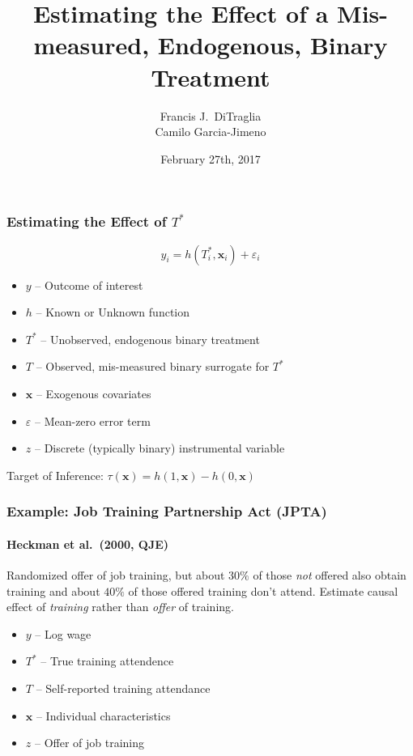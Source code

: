 \documentclass{beamer}
\title[Binary Regressors]{Estimating the Effect of a Mis-measured, Endogenous, Binary Treatment}
\author[FJ DiTraglia]{Francis J.\ DiTraglia\\ Camilo Garcia-Jimeno}
\institute{University of Pennsylvania}
\date{February 27th, 2017}
\begin{document}
 

\begin{frame}[plain]
	\titlepage 
\end{frame} 
\begin{frame}
  \frametitle{Estimating the Effect of $T^*$}
  \vspace{-1em}
  \[ y_i = h(T^*_i, \mathbf{x}_i) + \varepsilon_i\]
  \vspace{-1.5em}
  \begin{itemize}
    \item $y$ -- Outcome of interest
    \item $h$ -- Known or Unknown function 
    \item $T^*$ -- Unobserved, endogenous binary treatment
    \item $T$ -- Observed, mis-measured binary surrogate for $T^*$
    \item $\mathbf{x}$ -- Exogenous covariates
    \item $\varepsilon$ -- Mean-zero error term
    \item $z$ -- Discrete (typically binary) instrumental variable
  \end{itemize}

  \begin{block}{Target of Inference: $\tau(\mathbf{x}) = h(1,\mathbf{x}) - h(0,\mathbf{x})$}
  \end{block}
\end{frame}
\begin{frame}
  \frametitle{Example: Job Training Partnership Act (JPTA)}
\framesubtitle{Heckman et al.\ (2000, QJE)}
Randomized offer of job training, but about $30\%$ of those \emph{not} offered also obtain training and about $40\%$ of those offered training don't attend. Estimate causal effect of \emph{training} rather than \emph{offer} of training.

\begin{itemize}
  \item $y$ -- Log wage 
  \item $T^*$ -- True training attendence
  \item $T$ -- Self-reported training attendance
  \item $\mathbf{x}$ -- Individual characteristics
  \item $z$ -- Offer of job training
\end{itemize}
   
\end{frame}
\end{document}
